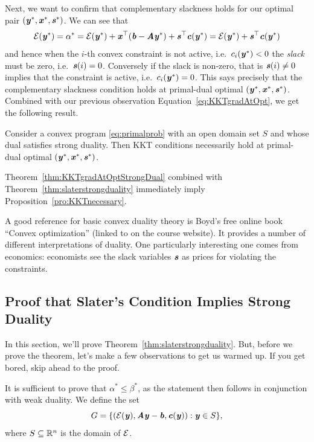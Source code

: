 {Next, we want to confirm that complementary slackness holds for our
optimal pair $(\yy^*, \xx^*, \ss^*)$.
We can see that
\begin{equation*}\energy(\yy^*) =  \alpha^* = \energy(\yy^*) + \xx^{\trp}(\bb - \AA\yy^*) + \ss^{\trp}\cc(\yy^*) = \energy(\yy^*) + \ss^{\trp}\cc(\yy^*) \end{equation*}
and hence when the $i$-th convex constraint is not active, i.e.\ $c_i(\yy^*) < 0$ the \emph{slack} must be zero, i.e.\ $\ss(i) = 0$.
Conversely if the slack is non-zero, that is $\ss(i) \neq 0$ implies
that the constraint is active, i.e.\ $c_i(\yy^*) = 0$.
This says precisely that the complementary slackness condition holds
at primal-dual optimal $(\yy^*, \xx^*, \ss^*)$.
Combined with our previous observation
Equation~\eqref{eq:KKTgradAtOpt}, we get the following result.

\begin{theorem}
  \label{thm:KKTgradAtOptStrongDual}
  Consider a convex program \eqref{eq:primalprob} with an open domain
  set $S$ and whose dual satisfies strong duality.  
Then  KKT conditions necessarily hold at primal-dual
  optimal $(\yy^*, \xx^*, \ss^*)$.
\end{theorem}

Theorem~\ref{thm:KKTgradAtOptStrongDual} combined with
Theorem~\ref{thm:slaterstrongduality} immediately
imply Proposition~\ref{pro:KKTnecessary}.

A good reference for basic convex duality theory is Boyd's free online book ``Convex
optimization'' (linked to on the course website).
It provides a number of different interpretations of duality. One
particularly interesting one comes from economics:
economists see the slack variables $\ss$ as prices for violating the constraints.


\subsection{Proof that Slater's Condition Implies Strong Duality}

In this section, we'll prove Theorem~\ref{thm:slaterstrongduality}.
But, before we prove the theorem, let's make a few observations to get us
warmed up. If you get bored, skip ahead to the proof.

It is sufficient to prove that $\alpha^* \leq \beta^*$, as the statement then follows in conjunction with weak duality.
We define the set
\begin{equation*} G = \{(\energy(\yy), \AA\yy - \bb, \cc(\yy)) : \yy \in S \}, \end{equation*}
where $S \subseteq \R^n$ is the domain of $\energy$.

}
